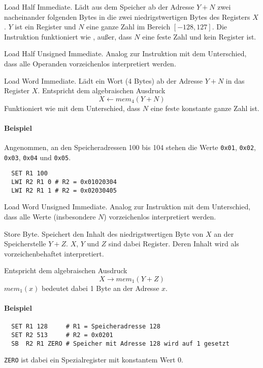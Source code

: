 \glqq Load Half Immediate\grqq.
Lädt aus dem Speicher ab der Adresse $Y + N$ zwei nacheinander folgenden Bytes
in die zwei niedrigstwertigen Bytes des Registers $X$.
$Y$ ist ein Register und $N$ eine ganze Zahl im Bereich $[-128, 127]$.
Die Instruktion funktioniert wie , außer, dass $N$ eine feste Zahl und
kein Register ist.


\glqq Load Half Unsigned Immediate\grqq.
Analog zur Instruktion  mit dem Unterschied, dass alle Operanden
vorzeichenlos interpretiert werden.


\glqq Load Word Immediate\grqq.
Lädt ein Wort (4 Bytes) ab der Adresse $Y + N$ in das Register $X$. Entspricht
dem algebraischen Ausdruck
\[
    X \gets mem_{4}(Y + N)
\]
Funktioniert wie  mit dem Unterschied, dass $N$ eine feste konstante
ganze Zahl ist.

\paragraph{Beispiel}
Angenommen, an den Speicheradressen 100 bis 104 stehen die Werte \texttt{0x01},
\texttt{0x02}, \texttt{0x03}, \texttt{0x04} und \texttt{0x05}.
\begin{lstlisting}
  SET R1 100
  LWI R2 R1 0 # R2 = 0x01020304
  LWI R2 R1 1 # R2 = 0x02030405
\end{lstlisting}


\glqq Load Word Unsigned Immediate\grqq.
Analog zur Instruktion  mit dem Unterschied, dass alle Werte
(insbesondere $N$) vorzeichenlos interpretiert werden.



\glqq Store Byte\grqq.
Speichert den Inhalt des niedrigstwertigen Byte von $X$ an der Speicherstelle
$Y + Z$. $X$, $Y$ und $Z$ sind dabei Register. Deren Inhalt wird als
vorzeichenbehaftet interpretiert.

Entspricht dem algebraischen Ausdruck
\[
    X \to mem_{1} (Y + Z)
\]
$mem_{1}(x)$ bedeutet dabei 1 Byte an der Adresse $x$.

\paragraph{Beispiel}
\begin{lstlisting}
  SET R1 128     # R1 = Speicheradresse 128
  SET R2 513     # R2 = 0x0201
  SB  R2 R1 ZERO # Speicher mit Adresse 128 wird auf 1 gesetzt
\end{lstlisting}
\texttt{ZERO} ist dabei ein Spezialregister mit konstantem Wert $0$.


